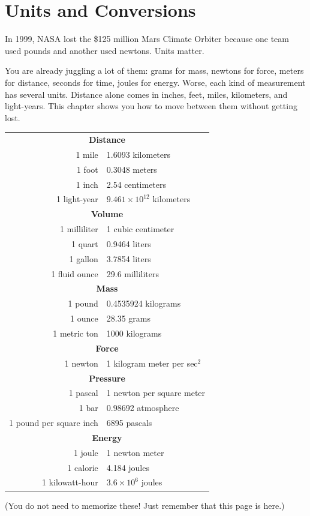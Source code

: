 \chapter{Units and Conversions}

In 1999, NASA lost the \$125 million Mars Climate Orbiter because one team used pounds and another used newtons. Units matter.

You are already juggling a lot of them: grams for mass, newtons for force, meters for distance, seconds for time, joules for energy. Worse, each kind of measurement has several units. Distance alone comes in inches, feet, miles, kilometers, and light-years. This chapter shows you how to move between them without getting lost.

\begin{mdframed}[style=important, frametitle={Some Equivalencies}]

\begin{tabular}{r | l}
  \hline
  \multicolumn{2}{c}{\textbf{Distance}}\\
  1 mile & 1.6093 kilometers \\
  1 foot & 0.3048 meters \\
  1 inch & 2.54 centimeters \\
  1 light-year & $9.461 \times 10^{12}$ kilometers\\
  \hline
  \multicolumn{2}{c}{\textbf{Volume}}\\
  1 milliliter & 1 cubic centimeter \\
  1 quart & 0.9464 liters \\
  1 gallon & 3.7854 liters \\
  1 fluid ounce & 29.6 milliliters \\
  \hline
  \multicolumn{2}{c}{\textbf{Mass}}\\
  1 pound & 0.4535924 kilograms\\
  1 ounce & 28.35 grams\\
  1 metric ton & 1000 kilograms \\
  \hline
  \multicolumn{2}{c}{\textbf{Force}}\\
  1 newton & 1 kilogram meter per sec$^2$\\
  \hline
  \multicolumn{2}{c}{\textbf{Pressure}}\\
  1 pascal\index{pascal} & 1 newton per square meter \\
  1 bar & 0.98692 atmosphere \\
  1 pound per square inch & 6895 pascals \\
  \hline
  \multicolumn{2}{c}{\textbf{Energy}}\\
  1 joule & 1 newton meter \\
  1 calorie & 4.184 joules \\
  1 kilowatt-hour\index{kilowatt-hour} & $3.6 \times 10^{6}$ joules  \\
\end{tabular}

(You do not need to memorize these! Just remember that this page is here.)

\end{mdframed}


